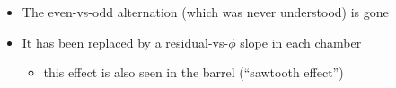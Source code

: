 \documentclass[compress]{beamer}
\begin{document}
\begin{frame}
\begin{columns}
\end{columns}

\begin{itemize}
\item The even-vs-odd alternation (which was never understood) is gone
\item It has been replaced by a residual-vs-$\phi$ slope in each chamber
\begin{itemize}
\item this effect is also seen in the barrel (``sawtooth effect'')
\end{itemize}
\end{itemize}
\end{frame}
\end{document}
